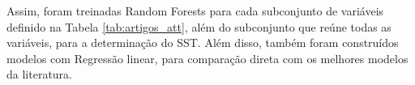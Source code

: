 Assim, foram treinadas Random Forests para cada subconjunto de variáveis definido na Tabela \ref{tab:artigos_att}, além do subconjunto que reúne todas as variáveis, para a determinação do SST. Além disso, também foram construídos modelos com Regressão linear, para comparação direta com os melhores modelos da literatura.







